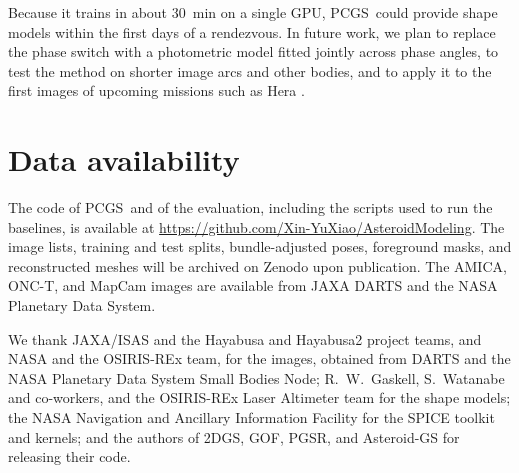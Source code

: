 \documentclass[fleqn,usenatbib]{aa}
\newcommand{\pcgs}{PCGS}
\begin{document}
Because it trains in about 30~min on a single GPU, \pcgs\ could provide shape models within the first days of a
rendezvous. In future work, we plan to replace the phase switch with a photometric model fitted jointly across phase
angles, to test the method on shorter image arcs and other bodies, and to apply it to the first images of upcoming
missions such as Hera \citep{Michel2022}.

\section*{Data availability}
The code of \pcgs\ and of the evaluation, including the scripts used to run the baselines, is available at
\url{https://github.com/Xin-YuXiao/AsteroidModeling}. The image lists, training and test splits, bundle-adjusted poses,
foreground masks, and reconstructed meshes will be archived on Zenodo upon publication. The AMICA, ONC-T, and MapCam
images are available from JAXA DARTS and the NASA Planetary Data System.

\begin{acknowledgements}
We thank JAXA/ISAS and the Hayabusa and Hayabusa2 project teams, and NASA and the OSIRIS-REx team, for the images,
obtained from DARTS and the NASA Planetary Data System Small Bodies Node; R.~W.~Gaskell, S.~Watanabe and co-workers,
and the OSIRIS-REx Laser Altimeter team for the shape models; the NASA Navigation and Ancillary Information Facility
for the SPICE toolkit and kernels; and the authors of 2DGS, GOF, PGSR, and Asteroid-GS for releasing their code.
\end{acknowledgements}



\end{document}
